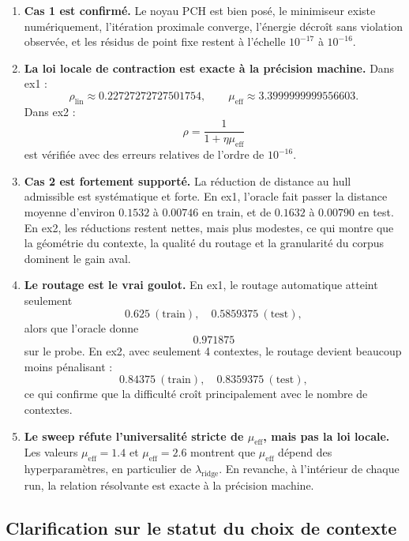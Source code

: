 \begin{enumerate}
    \item \textbf{Cas 1 est confirmé.}
    Le noyau PCH est bien posé, le minimiseur existe numériquement, l’itération proximale converge, l’énergie décroît sans violation observée, et les résidus de point fixe restent à l’échelle \(10^{-17}\) à \(10^{-16}\).

    \item \textbf{La loi locale de contraction est exacte à la précision machine.}
    Dans ex1 :
    \[
    \rho_{\mathrm{lin}} \approx 0.22727272727501754,
    \qquad
    \mu_{\mathrm{eff}} \approx 3.3999999999556603.
    \]
    Dans ex2 :
    \[
    \rho = \frac{1}{1+\eta\mu_{\mathrm{eff}}}
    \]
    est vérifiée avec des erreurs relatives de l’ordre de \(10^{-16}\).

    \item \textbf{Cas 2 est fortement supporté.}
    La réduction de distance au hull admissible est systématique et forte.
    En ex1, l’oracle fait passer la distance moyenne d’environ \(0.1532\) à \(0.00746\) en train, et de \(0.1632\) à \(0.00790\) en test.
    En ex2, les réductions restent nettes, mais plus modestes, ce qui montre que la géométrie du contexte, la qualité du routage et la granularité du corpus dominent le gain aval.

    \item \textbf{Le routage est le vrai goulot.}
    En ex1, le routage automatique atteint seulement
    \[
    0.625\ (\text{train}),\quad 0.5859375\ (\text{test}),
    \]
    alors que l’oracle donne
    \[
    0.971875
    \]
    sur le probe.
    En ex2, avec seulement 4 contextes, le routage devient beaucoup moins pénalisant :
    \[
    0.84375\ (\text{train}),\quad 0.8359375\ (\text{test}),
    \]
    ce qui confirme que la difficulté croît principalement avec le nombre de contextes.

    \item \textbf{Le sweep réfute l’universalité stricte de \(\mu_{\mathrm{eff}}\), mais pas la loi locale.}
    Les valeurs \(\mu_{\mathrm{eff}}=1.4\) et \(\mu_{\mathrm{eff}}=2.6\) montrent que \(\mu_{\mathrm{eff}}\) dépend des hyperparamètres, en particulier de \(\lambda_{\mathrm{ridge}}\).
    En revanche, à l’intérieur de chaque run, la relation résolvante est exacte à la précision machine.
\end{enumerate}

\subsection{Clarification sur le statut du choix de contexte}

